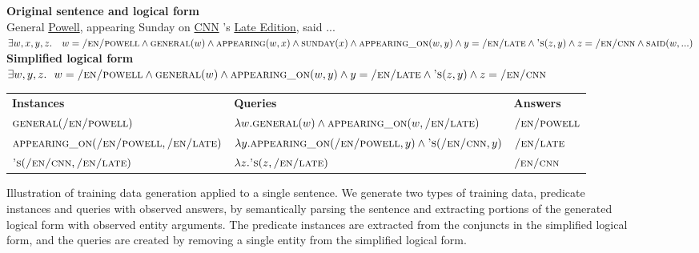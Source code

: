 \documentclass[11pt]{article}
\newcommand{\pred}[1]{\textsc{#1}}
\begin{document}
\begin{figure*}
\small

\textbf{Original sentence and logical form} \\
General \ul{Powell}, appearing Sunday on \ul{CNN} 's \ul{Late Edition}, said ... \\
{\small $\exists w,x,y,z. ~~~ w = \pred{/en/powell} \wedge \pred{general}(w) \wedge \pred{appearing}(w, x) \wedge \pred{sunday}(x) \wedge \pred{appearing\_on}(w, y) \wedge y = \pred{/en/late} \wedge \pred{'s}(z, y) \wedge z = \pred{/en/cnn} \wedge \pred{said}(w, ...)$ } \\

\textbf{Simplified logical form} \\
{\small $\exists w,y,z. ~~ w = \pred{/en/powell}  \wedge \pred{general}(w) \wedge \pred{appearing\_on}(w, y) \wedge y = \pred{/en/late} \wedge \pred{'s}(z, y) \wedge z = \pred{/en/cnn}$ } \\ 

{
\renewcommand{\tabcolsep}{0.1cm}
\begin{tabular}{l|ll}
\textbf{Instances} & \textbf{Queries} & \textbf{Answers} \\
{\small $\pred{general}(\pred{/en/powell})$ }& {\small $\lambda w.\pred{general}(w) \wedge \pred{appearing\_on}(w, \pred{/en/late})$ } & {\small $\pred{/en/powell}$ }\\
{\small $\pred{appearing\_on}(\pred{/en/powell}, \pred{/en/late})$ } & {\small $\lambda y.\pred{appearing\_on}(\pred{/en/powell}, y) \wedge \pred{'s}(\pred{/en/cnn}, y) $ } & {\small  $\pred{/en/late}$ }\\
{\small $\pred{'s}(\pred{/en/cnn}, \pred{/en/late})$ } & {\small $\lambda z.\pred{'s}(z, \pred{/en/late})$}& {\small $\pred{/en/cnn}$ }\\
\end{tabular}
}
\vspace{-.15in}
\caption{Illustration of training data generation applied to a single
  sentence. We generate two types of training data, predicate
  instances and queries with observed answers, by semantically parsing
  the sentence and extracting portions of the generated logical form
  with observed entity arguments. The predicate instances are
  extracted from the conjuncts in the simplified logical form, and the
  queries are created by removing a single entity from the simplified
  logical form.}
\label{fig:trainingdata}
\vspace{-.1in}
\end{figure*}
\end{document}
